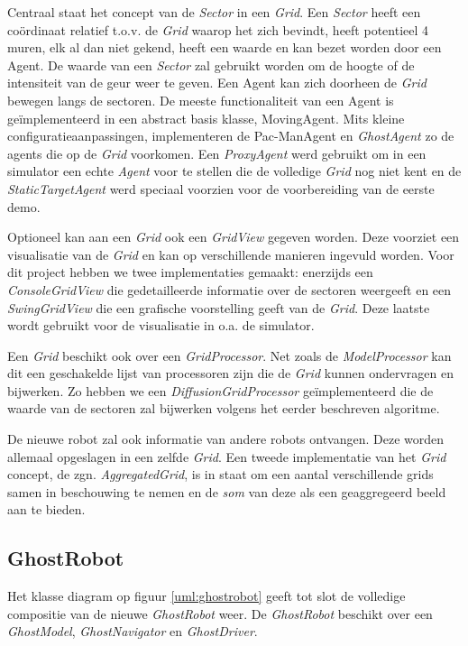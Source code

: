 \documentclass[12pt,a4paper]{report}
\begin{document}
Centraal staat het concept van de \emph{Sector} in een \emph{Grid}. Een \emph{Sector} heeft een co\"ordinaat relatief t.o.v. de \emph{Grid} waarop het zich bevindt, heeft potentieel 4 muren, elk al dan niet gekend, heeft een waarde en kan bezet worden door een Agent. De waarde van een \emph{Sector} zal gebruikt worden om de hoogte of de intensiteit van de geur weer te geven. Een Agent kan zich doorheen de \emph{Grid} bewegen langs de sectoren. De meeste functionaliteit van een Agent is ge\"implementeerd in een abstract basis klasse, MovingAgent. Mits kleine configuratieaanpassingen, implementeren de Pac-ManAgent en \emph{GhostAgent} zo de agents die op de \emph{Grid} voorkomen. Een \emph{ProxyAgent} werd gebruikt om in een simulator een echte \emph{Agent} voor te stellen die de volledige \emph{Grid} nog niet kent en de \emph{StaticTargetAgent} werd speciaal voorzien voor de voorbereiding van de eerste demo.

Optioneel kan aan een \emph{Grid} ook een \emph{GridView} gegeven worden. Deze voorziet een visualisatie van de \emph{Grid} en kan op verschillende manieren ingevuld worden. Voor dit project hebben we twee implementaties gemaakt: enerzijds een \emph{ConsoleGridView} die gedetailleerde informatie over de sectoren weergeeft en een \emph{SwingGridView} die een grafische voorstelling geeft van de \emph{Grid}. Deze laatste wordt gebruikt voor de visualisatie in o.a. de simulator.

Een \emph{Grid} beschikt ook over een \emph{GridProcessor}. Net zoals de \emph{ModelProcessor} kan dit een geschakelde lijst van processoren zijn die de \emph{Grid} kunnen ondervragen en bijwerken. Zo hebben we een \emph{DiffusionGridProcessor} ge\"implementeerd die de waarde van de sectoren zal bijwerken volgens het eerder beschreven algoritme.

De nieuwe robot zal ook informatie van andere robots ontvangen. Deze worden allemaal opgeslagen in een zelfde \emph{Grid}. Een tweede implementatie van het \emph{Grid} concept, de zgn. \emph{AggregatedGrid}, is in staat om een aantal verschillende grids samen in beschouwing te nemen en de \emph{som} van deze als een geaggregeerd beeld aan te bieden.

\subsection{GhostRobot}

Het klasse diagram op figuur \ref{uml:ghostrobot} geeft tot slot de volledige compositie van de nieuwe \emph{GhostRobot} weer. De \emph{GhostRobot} beschikt over een \emph{GhostModel}, \emph{GhostNavigator} en \emph{GhostDriver}.
\end{document}
